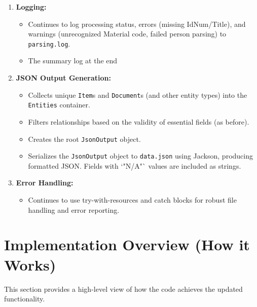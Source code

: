 \documentclass[11pt, a4paper]{article}
\begin{document}
\begin{enumerate}
    \item \textbf{Logging:}
        \begin{itemize}
            \item Continues to log processing status, errors (missing IdNum/Title), and warnings (unrecognized Material code, failed person parsing) to \texttt{parsing.log}.
            \item The summary log at the end
        \end{itemize}

    \item \textbf{JSON Output Generation:}
        \begin{itemize}
            \item Collects unique \texttt{Item}s and \texttt{Document}s (and other entity types) into the \texttt{Entities} container.
            \item Filters relationships based on the validity of essential fields (as before).
            \item Creates the root \texttt{JsonOutput} object.
            \item Serializes the \texttt{JsonOutput} object to \texttt{data.json} using Jackson, producing formatted JSON. Fields with `"N/A"` values are included as strings.
        \end{itemize}

    \item \textbf{Error Handling:}
        \begin{itemize}
            \item Continues to use try-with-resources and catch blocks for robust file handling and error reporting.
        \end{itemize}
\end{enumerate}

\section{Implementation Overview (How it Works)}
This section provides a high-level view of how the code achieves the updated functionality.
\end{document}
